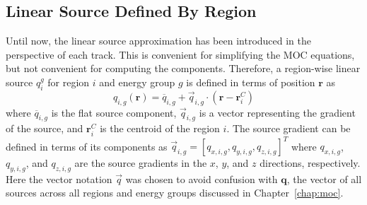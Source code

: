 \subsection{Linear Source Defined By Region}
\label{sec:derivation-of-moc}

Until now, the linear source approximation has been introduced in the perspective of each track. This is convenient for simplifying the MOC equations, but not convenient for computing the components. Therefore, a region-wise linear source $q_i^g$ for region $i$ and energy group $g$ is defined in terms of position $\mathbf{r}$ as
\begin{equation}
q_{i,g}(\mathbf{r}) = \overline{q}_{i,g} + \vec{q}_{i,g} \cdot \left( \mathbf{r} - \mathbf{r}^C_i \right)
\label{eq:ls-regional}
\end{equation}
where $\overline{q}_{i,g}$ is the flat source component, $\vec{q}_{i,g}$ is a vector representing the gradient of the source, and $\mathbf{r}^C_i$ is the centroid of the region $i$. The source gradient can be defined in terms of its components as $\vec{q}_{i,g} = \left[q_{x,i,g}, q_{y,i,g}, q_{z,i,g} \right]^T$ where $q_{x,i,g}$, $q_{y,i,g}$, and $q_{z,i,g}$ are the source gradients in the $x$, $y$, and $z$ directions, respectively. Here the vector notation $\vec{q}$ was chosen to avoid confusion with $\mathbf{q}$, the vector of all sources across all regions and energy groups discussed in Chapter~\ref{chap:moc}.

